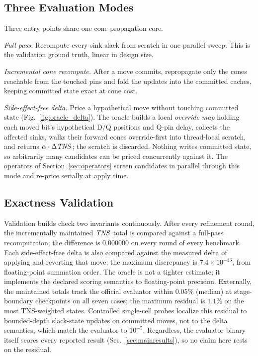 \subsection{Three Evaluation Modes}
\label{sec:oracle:modes}

Three entry points share one cone-propagation core.

\emph{Full pass.} Recompute every sink slack from scratch in one parallel sweep. This is the validation ground truth, linear in design size.

\emph{Incremental cone recompute.} After a move commits, repropagate only the cones reachable from the touched pins and fold the updates into the committed caches, keeping committed state exact at cone cost.

\emph{Side-effect-free delta.} Price a hypothetical move without touching committed state (Fig.~\ref{fig:oracle_delta}). The oracle builds a local \emph{override map} holding each moved bit's hypothetical D/Q positions and Q-pin delay, collects the affected sinks, walks their forward cones override-first into thread-local scratch, and returns $\alpha\cdot\Delta\mathit{TNS}$; the scratch is discarded. Nothing writes committed state, so arbitrarily many candidates can be priced concurrently against it. The operators of Section~\ref{sec:operators} screen candidates in parallel through this mode and re-price serially at apply time.

\subsection{Exactness Validation}
\label{sec:oracle:validation}

Validation builds check two invariants continuously. After every refinement round, the incrementally maintained $\mathit{TNS}$ total is compared against a full-pass recomputation; the difference is $0.000000$ on every round of every benchmark. Each side-effect-free delta is also compared against the measured delta of applying and reverting that move; the maximum discrepancy is $7.4\times10^{-13}$, from floating-point summation order. The oracle is not a tighter estimate; it implements the declared scoring semantics to floating-point precision. Externally, the maintained totals track the official evaluator within $0.05\%$ (median) at stage-boundary checkpoints on all seven cases; the maximum residual is $1.1\%$ on the most TNS-weighted states. Controlled single-cell probes localize this residual to bounded-depth slack-state updates on committed moves, not to the delta semantics, which match the evaluator to $10^{-5}$. Regardless, the evaluator binary itself scores every reported result (Sec.~\ref{sec:mainresults}), so no claim here rests on the residual.

